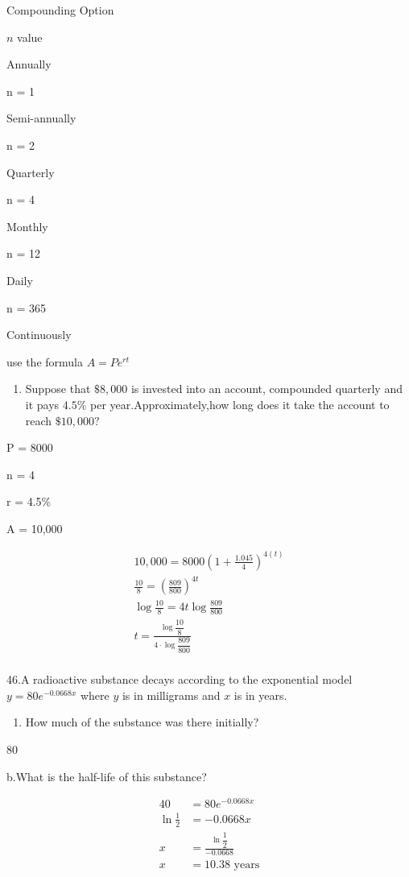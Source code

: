 \documentclass{book}
\begin{document}
Compounding Option

\(n\) value

Annually

n = 1

Semi-annually

n = 2

Quarterly

n = 4

Monthly

n = 12

Daily

n = 365

Continuously

use the formula \(A=Pe^{rt}\)

\begin{enumerate}
	\def\labelenumi{\arabic{enumi}.}
	\setcounter{enumi}{44}
	\tightlist
	\item
	      Suppose that \(\$8,000\) is invested into an account, compounded
	      quarterly and it pays \(4.5\%\) per year.Approximately,how long does
	      it take the account to reach \(\$10,000?\)
\end{enumerate}

P = 8000

n = 4

r = 4.5\%

A = 10,000


	\begin{align}
		10,000 = 8000 (1+\frac{1.045}{4})^{4(t)} \\ \frac{10}{8} = \left ( \frac{809}{800}\right )^{4t} \\ \log \frac{10}{8} = 4t \log \frac{809}{800} \\ t = \frac{\log \dfrac{10}{8}}{4 \cdot \log \dfrac{809}{800}} \\
	\end{align}


46.A radioactive substance decays according to the exponential model
\(y=80e^{-0.0668x}\) where \(y\) is in milligrams and \(x\) is in years.

\begin{enumerate}
	\def\labelenumi{\alph{enumi}.}
	\tightlist
	\item
	      How much of the substance was there initially?
\end{enumerate}

80

b.What is the half-life of this substance?


	\begin{align}
		40 & = 80 e^{-0.0668x} \\ \ln \frac{1}{2} &= -0.0668x \\ x &= \frac{\ln \dfrac{1}{2}}{-0.0668} \\ x &= 10.38 \text{ years} \\
	\end{align}
\end{document}
